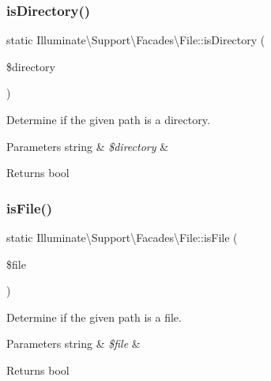 \subsubsection{\texorpdfstring{is\+Directory()}{isDirectory()}}
{\footnotesize\ttfamily static Illuminate\textbackslash{}\+Support\textbackslash{}\+Facades\textbackslash{}\+File\+::is\+Directory (\begin{DoxyParamCaption}\item[{}]{\$directory }\end{DoxyParamCaption})\hspace{0.3cm}{\ttfamily [static]}}

Determine if the given path is a directory.


\begin{DoxyParams}[1]{Parameters}
string & {\em \$directory} & \\
\hline
\end{DoxyParams}
\begin{DoxyReturn}{Returns}
bool 
\end{DoxyReturn}
\mbox{\label{class_illuminate_1_1_support_1_1_facades_1_1_file_a7daf336670d1a9d836488e499eff44f6}} 
\subsubsection{\texorpdfstring{is\+File()}{isFile()}}
{\footnotesize\ttfamily static Illuminate\textbackslash{}\+Support\textbackslash{}\+Facades\textbackslash{}\+File\+::is\+File (\begin{DoxyParamCaption}\item[{}]{\$file }\end{DoxyParamCaption})\hspace{0.3cm}{\ttfamily [static]}}

Determine if the given path is a file.


\begin{DoxyParams}[1]{Parameters}
string & {\em \$file} & \\
\hline
\end{DoxyParams}
\begin{DoxyReturn}{Returns}
bool 
\end{DoxyReturn}
\mbox{\label{class_illuminate_1_1_support_1_1_facades_1_1_file_a714920297a159ad88c60a875bdad6f8e}} 
